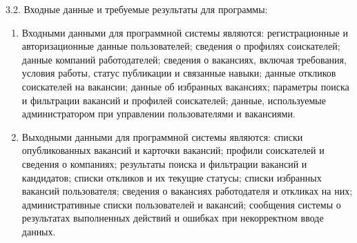 {\parindent0pt
  3.2. Входные данные и требуемые результаты для программы:}

\begin{enumerate}
	\item Входными данными для программной системы являются: регистрационные и авторизационные данные пользователей; сведения о профилях соискателей; данные компаний работодателей; сведения о вакансиях, включая требования, условия работы, статус публикации и связанные навыки; данные откликов соискателей на вакансии; данные об избранных вакансиях; параметры поиска и фильтрации вакансий и профилей соискателей; данные, используемые администратором при управлении пользователями и вакансиями.
	\item Выходными данными для программной системы являются: списки опубликованных вакансий и карточки вакансий; профили соискателей и сведения о компаниях; результаты поиска и фильтрации вакансий и кандидатов; списки откликов и их текущие статусы; списки избранных вакансий пользователя; сведения о вакансиях работодателя и откликах на них; административные списки пользователей и вакансий; сообщения системы о результатах выполненных действий и ошибках при некорректном вводе данных.
\end{enumerate}



